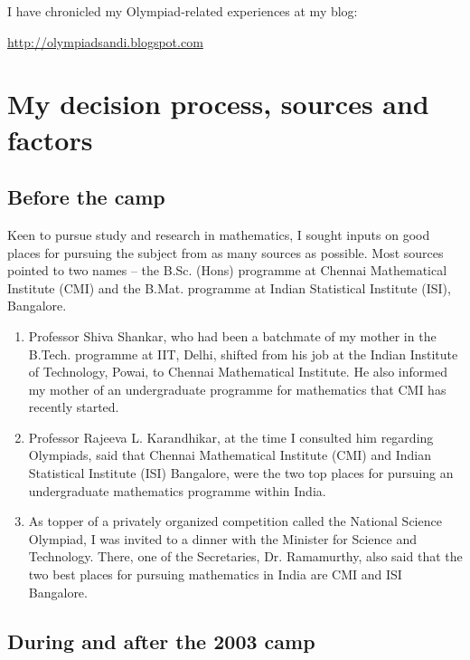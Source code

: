 \documentclass[a4paper]{amsart}
\begin{document}
I have chronicled my Olympiad-related experiences at my blog:

\url{http://olympiadsandi.blogspot.com}

\section{My decision process, sources and factors}

\subsection{Before the camp}

Keen to pursue study and research in mathematics, I sought inputs on
good places for pursuing the subject from as many sources as
possible. Most sources pointed to two names -- the B.Sc. (Hons)
programme at Chennai Mathematical Institute (CMI) and the B.Mat.
programme at Indian Statistical Institute (ISI), Bangalore.

\begin{enumerate}

\item Professor Shiva Shankar, who had been a batchmate of my mother
  in the B.Tech. programme at IIT, Delhi, shifted from his job at the
  Indian Institute of Technology, Powai, to Chennai Mathematical
  Institute.  He also informed my mother of an undergraduate programme
  for mathematics that CMI has recently started.

\item Professor Rajeeva L. Karandhikar, at the time I consulted
  him regarding Olympiads, said that Chennai Mathematical Institute (CMI)
  and Indian Statistical Institute (ISI) Bangalore, were the two top
  places for pursuing an undergraduate mathematics programme within India.

\item As topper of a privately organized competition called the National
  Science Olympiad, I was invited to a dinner with the Minister for Science
  and Technology. There, one of the Secretaries, Dr. Ramamurthy, also
  said that the two best places for pursuing mathematics in India
  are CMI and ISI Bangalore.

\end{enumerate}

\subsection{During and after the 2003 camp}
\end{document}
